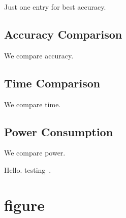\documentclass[11pt,twocolumn]{article}
\begin{document}
Just one entry for best accuracy.

\subsection{Accuracy Comparison}

We compare accuracy.

\subsection{Time Comparison}

We compare time.

\subsection{Power Consumption}

We compare power.

Hello. testing~\cite{las21openapi}.

\section{figure}
\end{document}
